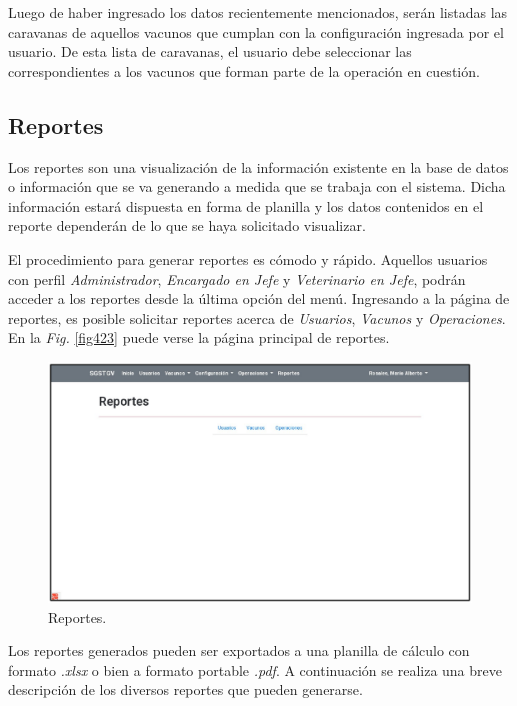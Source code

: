 \documentclass[11pt,oneside]{book}
\begin{document}
Luego de haber ingresado los datos recientemente mencionados, serán listadas las caravanas de aquellos vacunos que cumplan con la configuración ingresada por el usuario. De esta lista de caravanas, el usuario debe seleccionar las correspondientes a los vacunos que forman parte de la operación en cuestión.

\subsection{Reportes}\label{Rep}
Los reportes son una visualización de la información existente en la base de datos o información que se va generando a medida que se trabaja con el sistema. Dicha información estará dispuesta en forma de planilla y los datos contenidos en el reporte dependerán de lo que se haya solicitado visualizar.

El procedimiento para generar reportes es cómodo y rápido. Aquellos usuarios con perfil \textit{Administrador}, \textit{Encargado en Jefe} y \textit{Veterinario en Jefe}, podrán acceder a los reportes desde la última opción del menú. Ingresando a la página de reportes, es posible solicitar reportes acerca de \textit{Usuarios}, \textit{Vacunos} y \textit{Operaciones}. En la \textit{Fig.} \eqref{fig423} puede verse la página principal de reportes.

\begin{figure}[tbhp]
\centerline{\includegraphics[scale=0.87]{figs/capitulo_4_desarrollo/fig423.pdf}}
\caption{Reportes.}
\label{fig423}
\end{figure}

Los reportes generados pueden ser exportados a una planilla de cálculo con formato \textit{.xlsx} o bien a formato portable \textit{.pdf}. A continuación se realiza una breve descripción de los diversos reportes que pueden generarse.
\end{document}
